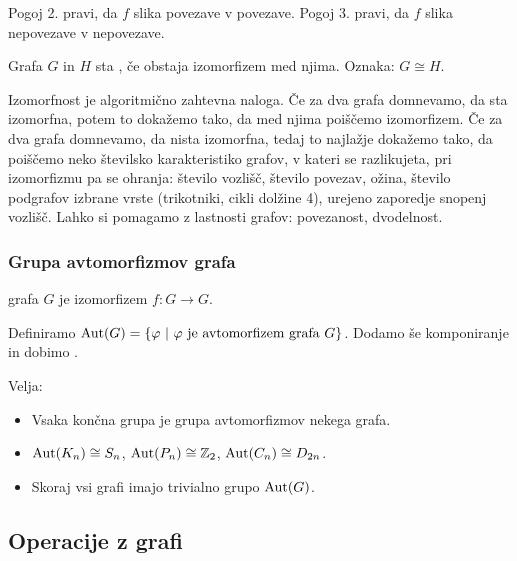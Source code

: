 \begin{opomba}
    Pogoj 2. pravi, da $f$ slika povezave v povezave. Pogoj 3. pravi, da $f$ slika nepovezave v nepovezave.
\end{opomba}

\begin{definicija}
    Grafa $G$ in $H$ sta , če obstaja izomorfizem med njima. Oznaka: $G \cong H$.
\end{definicija}

\begin{opomba}
    Izomorfnost je algoritmično zahtevna naloga. Če za dva grafa domnevamo, da sta izomorfna, potem to dokažemo tako, da med njima poiščemo izomorfizem. Če za dva grafa domnevamo, da nista izomorfna, tedaj to najlažje dokažemo tako, da poiščemo neko številsko karakteristiko grafov, v kateri se razlikujeta, pri izomorfizmu pa se ohranja: število vozlišč, število povezav, ožina, število podgrafov izbrane vrste (trikotniki, cikli dolžine 4), urejeno zaporedje snopenj vozlišč. Lahko si pomagamo z lastnosti grafov: povezanost, dvodelnost.
\end{opomba}

\subsubsection*{Grupa avtomorfizmov grafa}
\begin{definicija}
     grafa $G$ je izomorfizem $f: G \to G$.
\end{definicija}

Definiramo $\operatorname{Aut} (G) = \left\{\varphi \ | \ \varphi \text{ je avtomorfizem grafa } G\right\}$. Dodamo še komponiranje in dobimo .

\begin{opomba}
    Velja:
    \begin{itemize}
        \item Vsaka končna grupa je grupa avtomorfizmov nekega grafa.
        \item $\operatorname{Aut}(K_n) \cong S_n$, $\operatorname{Aut}(P_n) \cong \mathbb{Z}_2$, $\operatorname{Aut}(C_n) \cong D_{2n}$.
        \item Skoraj vsi grafi imajo trivialno grupo $\operatorname{Aut}(G)$.
    \end{itemize}
\end{opomba}

\subsection{Operacije z grafi}
